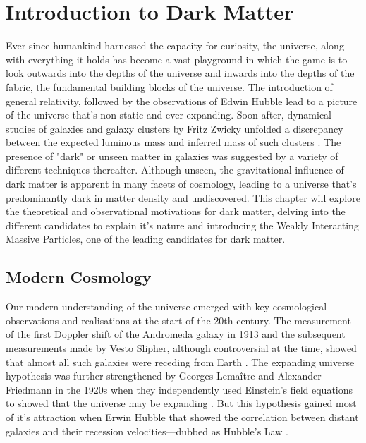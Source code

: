 \chapter{Introduction to Dark Matter}
\label{chap:chap1}


Ever since humankind harnessed the capacity for curiosity, the universe, along with everything it holds has become a vast playground in which the game is to look outwards into the depths of the universe and inwards into the depths of the fabric, the fundamental building blocks of the universe. The introduction of general relativity, followed by the observations of Edwin Hubble lead to a picture of the universe that's non-static and ever expanding. Soon after, dynamical studies of galaxies and galaxy clusters by Fritz Zwicky unfolded a discrepancy between the expected luminous mass and inferred mass of such clusters \cite{Fritz_Zwicky_1993}. The presence of "dark" or unseen matter in galaxies was suggested by a variety of different techniques thereafter. Although unseen, the gravitational influence of dark matter is apparent in many facets of cosmology, leading to a universe that's predominantly dark in matter density and undiscovered. This chapter will explore the theoretical and observational motivations for dark matter, delving into the different candidates to explain it's nature and introducing the Weakly Interacting Massive Particles, one of the leading candidates for dark matter. 

\section{Modern Cosmology}
\label{sec:moderncosmology}

Our modern understanding of the universe emerged with key cosmological observations and realisations at the start of the 20th century. The measurement of the first Doppler shift of the Andromeda galaxy in 1913 and the subsequent measurements made by Vesto Slipher, although controversial at the time, showed that almost all such galaxies were receding from Earth \cite{Slipler}. The expanding universe hypothesis was further strengthened by Georges Lemaître and Alexander Friedmann in the 1920s when they independently used Einstein's field equations to showed that the universe may be expanding \cite{Friedman}. But this hypothesis gained most of it's attraction when Erwin Hubble that showed the correlation between distant galaxies and their recession velocities---dubbed as Hubble's Law \cite{Hubble}.


